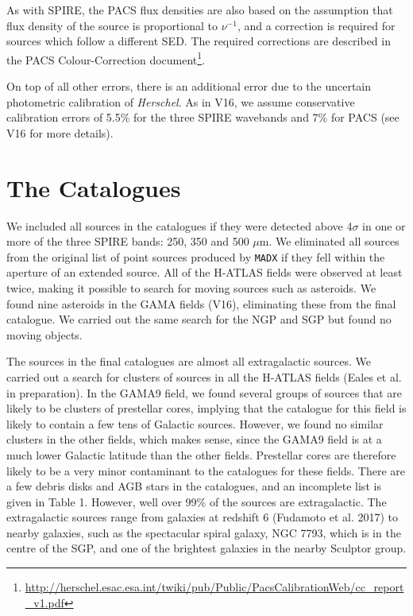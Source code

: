 \documentclass[a4paper,fleqn,usenatbib, twocolumn]{aastex61}
\begin{document}
As with SPIRE, the PACS flux densities are also based on the
assumption that flux density of the source is proportional to
$\nu^{-1}$, and a correction is required for sources which follow a
different SED. The required corrections are described in the PACS
Colour-Correction
document\footnote{\url{http://herschel.esac.esa.int/twiki/pub/Public/PacsCalibrationWeb/cc\_report\_v1.pdf}}.

On top of all other errors, there is an additional error due to the
uncertain photometric calibration of {\it Herschel}. As in V16, we assume
conservative calibration errors of 5.5\% for the three SPIRE wavebands
and 7\% for PACS (see V16 for more details).

\section{The Catalogues}

We included all sources in the catalogues if they were detected above
4$\sigma$ in one or more of the three SPIRE bands: 250, 350 and
500 $\mu$m.  We eliminated all sources from the original list of point
sources produced by {\tt MADX} if they fell within the aperture of an
extended source. All of the H-ATLAS fields were observed at least
twice, making it possible to search for moving sources such as
asteroids. We found nine asteroids in the GAMA fields (V16), eliminating
these from the final catalogue. We carried out the same search for the
NGP and SGP but found no moving objects.


The sources in the final catalogues are almost all extragalactic
sources. We carried out a search for clusters of sources in all the
H-ATLAS fields (Eales et al. in preparation).  In the GAMA9 field, we
found several groups of sources that are likely to be clusters of
prestellar cores, implying that the catalogue for this field is likely
to contain a few tens of Galactic sources.  However, we found no
similar clusters in the other fields, which makes sense, since the
GAMA9 field is at a much lower Galactic latitude than the other
fields. Prestellar cores are therefore likely to be a very minor
contaminant to the catalogues for these fields. There are a few debris
disks and AGB stars in the catalogues, and an incomplete list is given
in Table 1.  However, well over 99\% of the sources are
extragalactic. The extragalactic sources range from galaxies at
redshift 6 (Fudamoto et al. 2017) to nearby galaxies, such as the
spectacular spiral galaxy, NGC 7793, which is in the centre of the
SGP, and one of the brightest galaxies in the nearby Sculptor group.
\end{document}
